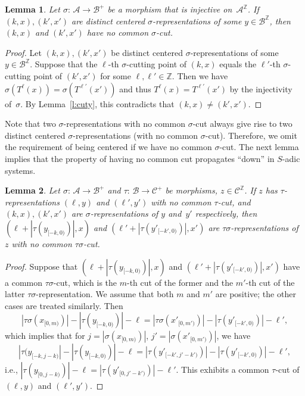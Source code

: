 \documentclass{amsart}
\newtheorem{lemma}{Lemma}[section]
\theoremstyle{definition}
\theoremstyle{remark}
\numberwithin{equation}{section}
\begin{document}
\begin{lemma} \label{l:injectivecut}
Let $\sigma:\, \mathcal{A} \to \mathcal{B}^+$ be a morphism that is injective on~$\mathcal{A}^\mathbb{Z}$.
If $(k,x), (k',x')$ are distinct centered $\sigma$-representations of some $y \in \mathcal{B}^\mathbb{Z}$, then $(k,x)$ and $(k',x')$ have no common $\sigma$-cut. 
\end{lemma}

\begin{proof}
Let $(k,x), (k',x')$ be distinct centered $\sigma$-representations of some $y \in \mathcal{B}^\mathbb{Z}$.
Suppose that the $\ell$-th $\sigma$-cutting point of $(k,x)$ equals the $\ell'$-th $\sigma$-cutting point of $(k',x')$ for some $\ell, \ell' \in \mathbb{Z}$. 
Then we have $\sigma(T^\ell(x)) = \sigma(T^{\ell'}(x'))$ and thus $T^\ell(x) = T^{\ell'}(x')$ by the injectivity of~$\sigma$.
By Lemma~\ref{l:cuty}, this contradicts that $(k,x) \ne (k',x')$. 
\end{proof}

Note that two $\sigma$-representations with no common $\sigma$-cut always give rise to two distinct centered $\sigma$-representations (with no common $\sigma$-cut). 
Therefore, we omit the requirement of being centered if we have no common $\sigma$-cut.
The next lemma implies that the property of having no common cut propagates ``down'' in $S$-adic systems. 

\begin{lemma}\label{l:cutpropagation}
Let $\sigma:\, \mathcal{A} \to \mathcal{B}^+$ and $\tau:\, \mathcal{B}\to\mathcal{C}^+$ be morphisms, $z \in \mathcal{C}^\mathbb{Z}$. 
If $z$ has $\tau$-representations $(\ell,y)$ and $(\ell',y')$ with no common $\tau$-cut, and $(k,x), (k',x')$ are $\sigma$-representations of $y$ and~$y'$ respectively, then $(\ell+|\tau(y_{[-k,0)})|,x)$ and $(\ell'+|\tau(y'_{[-k',0)})|,x')$ are $\tau \sigma$-representations of~$z$ with no common $\tau \sigma$-cut.
\end{lemma}

\begin{proof}
Suppose that $(\ell+|\tau(y_{[-k,0)})|,x)$ and $(\ell'+|\tau(y'_{[-k',0)})|,x')$ have a common $\tau \sigma$-cut, which is the $m$-th cut of the former and the $m'$-th cut of the latter $\tau \sigma$-representation. 
We assume that both $m$ and $m'$ are positive; the other cases are treated similarly. 
Then 
\[
|\tau\sigma(x_{[0,m)})| - |\tau(y_{[-k,0)})| - \ell = |\tau\sigma(x'_{[0,m')})| - |\tau(y'_{[-k',0)})| - \ell',
\]
which implies that for $j = |\sigma(x_{[0,m)})|$, $j' = |\sigma(x'_{[0,m')})|$, we have
\[
|\tau(y_{[-k,j-k)}|  -  |\tau(y_{[-k,0)})| - \ell = |\tau(y'_{[-k',j'-k')})| - |\tau(y'_{[-k',0)})| - \ell',
\]
i.e., $|\tau(y_{[0,j-k)})|-\ell = |\tau(y'_{[0,j'-k')})|-\ell'$.
This exhibits a common $\tau$-cut of $(\ell,y)$ and $(\ell',y')$.
\end{proof}
\end{document}
